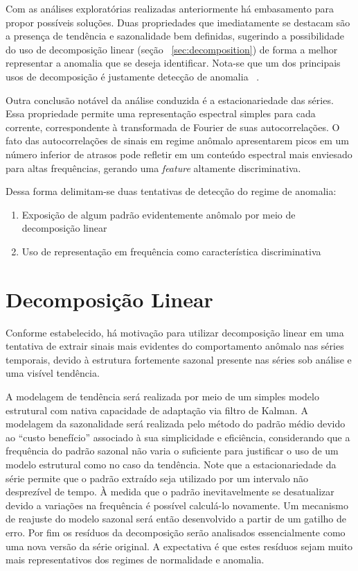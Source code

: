 Com as análises exploratórias realizadas anteriormente há embasamento para
propor possíveis soluções. Duas propriedades que imediatamente se destacam são
a presença de tendência e sazonalidade bem definidas, sugerindo a possibilidade
do uso de decomposição linear (seção ~\ref{sec:decomposition}) de forma a melhor
representar a anomalia que se deseja identificar. Nota-se que um dos principais
usos de decomposição é justamente detecção de anomalia
~\cite{anomaly_detection_decomposition}.

Outra conclusão notável da análise conduzida é a estacionariedade das séries.
Essa propriedade permite uma representação espectral simples para cada
corrente, correspondente à transformada de Fourier de suas autocorrelações.
O fato das autocorrelações de sinais em regime anômalo apresentarem picos em
um número inferior de atrasos pode refletir em um conteúdo espectral mais
enviesado para altas frequências, gerando uma \emph{feature} altamente
discriminativa.

Dessa forma delimitam-se duas tentativas de detecção do regime de anomalia:

\begin{enumerate}
    \item Exposição de algum padrão evidentemente anômalo por meio de decomposição linear
    \item Uso de representação em frequência como característica discriminativa
\end{enumerate}

\section{Decomposição Linear}

Conforme estabelecido, há motivação para utilizar decomposição linear em uma
tentativa de extrair sinais mais evidentes do comportamento anômalo nas séries
temporais, devido à estrutura fortemente sazonal presente nas séries sob
análise e uma visível tendência.

A modelagem de tendência será realizada por meio de um simples modelo
estrutural com nativa capacidade de adaptação via filtro de Kalman. A modelagem
da sazonalidade será realizada pelo método do padrão médio devido ao ``custo
benefício'' associado à sua simplicidade e eficiência, considerando que a
frequência do padrão sazonal não varia o suficiente para justificar o uso de
um modelo estrutural como no caso da tendência. Note
que a estacionariedade da série permite que o padrão extraído seja utilizado
por um intervalo não desprezível de tempo. À medida que o padrão
inevitavelmente se desatualizar devido a variações na frequência é possível
calculá-lo novamente. Um mecanismo de reajuste do modelo sazonal será então
desenvolvido a partir de um gatilho de erro. Por fim os resíduos da
decomposição serão analisados essencialmente como uma nova versão da série
original. A expectativa é que estes resíduos sejam muito mais representativos
dos regimes de normalidade e anomalia.

